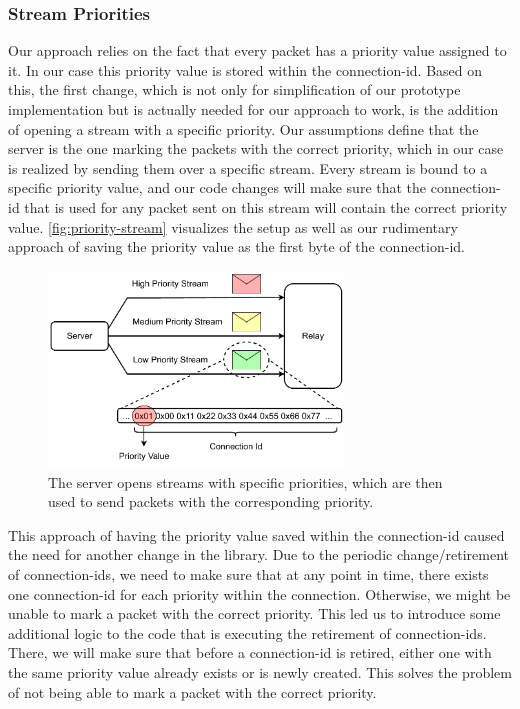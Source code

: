 \subsubsection*{Stream Priorities}
Our approach relies on the fact that every packet has a priority value assigned to it.
In our case this priority value is stored within the connection-id.
Based on this, the first change, which is not only for simplification of our prototype implementation but is actually needed for 
our approach to work, is the addition of opening a stream with a specific priority.
Our assumptions define that the server is the one marking the packets with the correct priority, which in 
our case is realized by sending them over a specific stream.
Every stream is bound to a specific priority value, and our code changes will make sure that the connection-id
that is used for any packet sent on this stream will contain the correct priority value.
\autoref{fig:priority-stream} visualizes the setup as well as our rudimentary approach of saving the 
priority value as the first byte of the connection-id.

\vspace{0.5cm}
\begin{figure}[H]
    \centering
    \includegraphics[width=0.7\textwidth]{figures/03_fast_relays/priority-streams.drawio.pdf}
    \caption[Streams with specific priorities]{The server opens streams with specific priorities, 
    which are then used to send packets with the corresponding priority.}\label{fig:priority-stream}
\end{figure}

This approach of having the priority value saved within the connection-id caused the need for another 
change in the library.
Due to the periodic change/retirement of connection-ids, we need to make sure that at any point in time, there 
exists one connection-id for each priority within the connection.
Otherwise, we might be unable to mark a packet with the correct priority.
This led us to introduce some additional logic to the code that is executing the retirement of connection-ids.
There, we will make sure that before a connection-id is retired, either one with the same priority value
already exists or is newly created.
This solves the problem of not being able to mark a packet with the correct priority.


